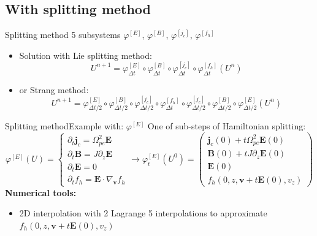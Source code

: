 \documentclass{beamer}
\newcommand{\mbold}[1]{{\textbf{\color{PLB}#1}}}
\newcommand{\Mvb}[1]{\boldsymbol{#1}}
\begin{document}
\subsection{With splitting method}
\begin{frame}{Splitting method}
  5 subsystems $\varphi^{[E]}$, $\varphi^{[B]}$, $\varphi^{[j_c]}$, $\varphi^{[f_h]}$


  \begin{itemize}
    \item Solution with Lie splitting method:
      $$
        U^{n+1} = \varphi_{\Delta t}^{[E]}
            \circ \varphi_{\Delta t}^{[B]}
            \circ \varphi_{\Delta t}^{[j_c]}
            \circ \varphi_{\Delta t}^{[f_h]} (U^n)
      $$
    \item or Strang method:
      $$
        U^{n+1} = \varphi_{\Delta t/2}^{[E]}
            \circ \varphi_{\Delta t/2}^{[B]}
            \circ \varphi_{\Delta t/2}^{[j_c]}
            \circ \varphi_{\Delta t}^{[f_h]}
            \circ \varphi_{\Delta t/2}^{[j_c]}
            \circ \varphi_{\Delta t/2}^{[B]}
            \circ \varphi_{\Delta t/2}^{[E]} (U^n)
      $$
  \end{itemize}
\end{frame}
\begin{frame}{Splitting method}{Example with: $\varphi^{[E]}$}
  One of sub-steps of Hamiltonian splitting:
  $$
    \varphi^{[E]}(U) =
    \begin{cases}
      \partial_t \Mvb{j}_c = \Omega_{pe}^2\Mvb{E} \\
      \partial_t \Mvb{B} = J\partial_z\Mvb{E} \\
      \partial_t \Mvb{E} = 0 \\
      \partial_t f_h = \Mvb{E}\cdot\nabla_{\Mvb{v}}f_h
    \end{cases}
    \rightarrow
    \varphi_{t}^{[E]}(U^0) = \begin{pmatrix}
      \Mvb{j}_c(0) + t\Omega_{pe}^2\Mvb{E}(0) \\
      \Mvb{B}(0) + tJ\partial_z\Mvb{E}(0) \\
      \Mvb{E}(0) \\
      f_h(0,z,\Mvb{v}+t\Mvb{E}(0),v_z)
    \end{pmatrix}
  $$
  \mbold{Numerical tools:}
  \begin{itemize}
    \item 2D interpolation with 2 Lagrange 5 interpolations to approximate $f_h(0,z,\Mvb{v}+t\Mvb{E}(0),v_z)$
  \end{itemize}
\end{frame}
\end{document}
